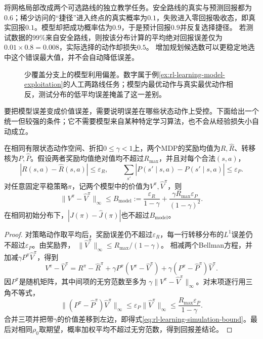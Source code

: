 \begin{example}[优化器选择了最乐观的错误]
  \label{ex:rl-learning-model-exploitation}
  将网格局部改成两个可选路线的独立教学任务。安全路线的真实与预测回报都为$0.6$；稀少访问的“捷径”进入终点的真实概率为$0.1$，失败进入零回报吸收态，即真实回报$0.1$。模型却把成功概率估为$0.9$，于是预计回报$0.9$并反复选择捷径。
  若测试数据的$99\%$来自安全路线，则按该分布计算的平均绝对回报误差仅为$0.01\times0.8=0.008$，实际选择的动作却损失$0.5$。
  增加规划候选数可以更稳定地选中这个错误最大值，并不会自动降低误差。
\end{example}

\begin{figure}[htbp]
  \centering
  
  \caption{少覆盖分支上的模型利用偏差。数字属于例\ref{ex:rl-learning-model-exploitation}的人工两路线任务；模型内最优动作与真实最优动作相反，测试分布的低平均误差掩盖了这一差别。}
  \label{fig:rl-learning-model-exploitation}
\end{figure}

要把模型误差变成价值误差，需要说明误差在哪些状态动作上受控。下面给出一个统一但较强的条件；它不需要模型来自某种特定学习算法，也不会从经验损失小自动成立。

\begin{theorem}[固定策略的模型误差界]
  \label{thm:rl-learning-simulation}
  在相同有限状态动作空间、折扣$0\leq\gamma<1$上，两个MDP的奖励均值为$R,\widehat R$、转移核为$P,\widehat P$。假设两者奖励均值绝对值均不超过$R_{\max}$，并且对每个合法$(s,a)$，
  \[
    |R(s,a)-\widehat R(s,a)|\leq\varepsilon_R,\qquad
    \sum_{s'}|P(s'\mid s,a)-\widehat P(s'\mid s,a)|
       \leq\varepsilon_P.
  \]
  对任意固定平稳策略$\pi$，记两个模型中的价值为$V^\pi,\widehat V^\pi$，则
  \begin{equation}
    \|V^\pi-\widehat V^\pi\|_\infty
       \leq B_{\mathrm{model}}
       :=\frac{\varepsilon_R}{1-\gamma}
        +\frac{\gamma R_{\max}\varepsilon_P}{(1-\gamma)^2}.
    \label{eq:rl-learning-simulation-bound}
  \end{equation}
  在相同初始分布下，$|J(\pi)-\widehat J(\pi)|$也不超过$B_{\mathrm{model}}$。
\end{theorem}

\begin{proof}
  对策略动作取平均后，奖励误差仍不超过$\varepsilon_R$，每一行转移分布的$L^1$误差仍不超过$\varepsilon_P$。由奖励界，
  $\|\widehat V^\pi\|_\infty\leq R_{\max}/(1-\gamma)$。
  相减两个Bellman方程，并加减$\gamma P^\pi\widehat V^\pi$，得到
  \[
    V^\pi-\widehat V^\pi
     =R^\pi-\widehat R^\pi
       +\gamma P^\pi(V^\pi-\widehat V^\pi)
       +\gamma(P^\pi-\widehat P^\pi)\widehat V^\pi .
  \]
  因$P^\pi$是随机矩阵，其中间项的无穷范数至多为
  $\gamma\|V^\pi-\widehat V^\pi\|_\infty$。对末项逐行用三角不等式，
  \[
    \|(P^\pi-\widehat P^\pi)\widehat V^\pi\|_\infty
      \leq\varepsilon_P\|\widehat V^\pi\|_\infty
      \leq\frac{R_{\max}\varepsilon_P}{1-\gamma}.
  \]
  合并三项并把带$\gamma$的价值差移到左边，即得式\eqref{eq:rl-learning-simulation-bound}。最后对相同$\rho_0$取期望，概率加权平均不超过无穷范数，得到回报差结论。
\end{proof}

